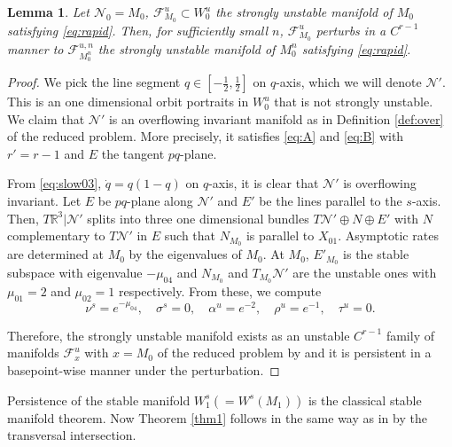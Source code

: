 \documentclass[a4paper,11pt]{article}
\newtheorem{lemma}{Lemma}[section]
\theoremstyle{remark}
\begin{document}
\begin{lemma} \label{lem:rapid}
 Let $\mathcal{N}_0=M_0$, $\mathcal{F}^u_{M_0}\subset W_0^u$ the strongly unstable manifold of $M_0$ satisfying \eqref{eq:rapid}. Then, for sufficiently small $n$, $\mathcal{F}^u_{M_0}$ perturbs in a $C^{r-1}$ manner to $\mathcal{F}^{u,n}_{M_0^n}$ the strongly unstable manifold of $M_0^n$ satisfying \eqref{eq:rapid}. 
\end{lemma}
\begin{proof}
 We pick the line segment $q\in [- \frac{1}{2}, \frac{1}{2}]$ on $q$-axis, which we will denote ${\mathcal{N}}'$. This is an one dimensional orbit portraits in $W_0^u$ that is not strongly unstable. We claim that ${\mathcal{N}}'$ is an overflowing invariant manifold as in Definition \ref{def:over} of the reduced problem. More precisely, it satisfies \eqref{eq:A} and \eqref{eq:B} with $r'=r-1$ and $E$ the tangent $pq$-plane. 
 
 From \eqref{eq:slow03}, $\dot{q}=q(1-q)$ on $q$-axis, it is clear that ${\mathcal{N}}'$ is overflowing invariant. Let $E$ be $pq$-plane along ${\mathcal{N}}'$ and $E'$ be the lines parallel to the $s$-axis. Then, $T \mathbb{R}^3|{\mathcal{N}}'$ splits into three one dimensional bundles $T{\mathcal{N}}'\oplus N \oplus E'$ with $N$ complementary to $T{\mathcal{N}}'$ in $E$ such that $N_{M_0}$ is parallel to $X_{01}$.  %
 Asymptotic rates are determined at $M_0$ by the eigenvalues of $M_0$. At $M_0$, $E'_{M_0}$ is the stable subspace with eigenvalue $-\mu_{04}$ and $N_{M_0}$ and $T_{M_0}{\mathcal{N}}'$ are the unstable ones with $\mu_{01}=2$ and $\mu_{02}=1$ respectively. From these, we compute 
 $$ \nu^s = e^{-\mu_{04}}, \quad\sigma^s = 0, \quad\alpha^u = e^{-2}, \quad\rho^u=e^{-1}, \quad\tau^u=0.$$

 Therefore, the strongly unstable manifold exists as an unstable $C^{r-1}$ family of manifolds $\mathcal{F}^u_x$ with $x=M_0$ of the reduced problem by \cite[Theorem 3]{fenichel_asymptotic_1977} and it is persistent in a basepoint-wise manner under the perturbation. 
\end{proof}
Persistence of the stable manifold $W_1^s (= W^s(M_1))$ is the classical stable manifold theorem. Now Theorem \ref{thm1} follows in the same way as in \cite[Theorem 3.1]{Sz1991} by the transversal intersection.
\end{document}
